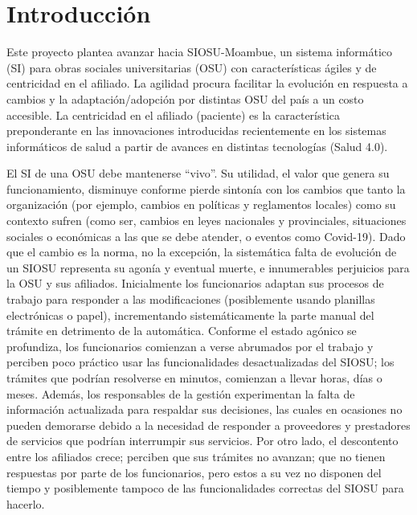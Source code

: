 \chapter{Introducción}


Este proyecto plantea avanzar hacia SIOSU-Moambue, un sistema informático (SI) para obras sociales universitarias (OSU) con características ágiles y de centricidad en el afiliado. La agilidad procura facilitar la evolución en respuesta a cambios y la adaptación/adopción por distintas OSU del país a un costo accesible.  La centricidad en el afiliado (paciente) es la característica preponderante en las innovaciones introducidas recientemente en los sistemas informáticos de salud a partir de avances en distintas tecnologías (Salud 4.0).

El SI de una OSU debe mantenerse “vivo”. Su utilidad, el valor que genera su funcionamiento, disminuye conforme pierde sintonía con los cambios que tanto la organización (por ejemplo, cambios en políticas y reglamentos locales) como su contexto sufren (como ser, cambios en leyes nacionales y provinciales, situaciones sociales o económicas a las que se debe atender, o eventos como Covid-19). Dado que el cambio es la norma, no la excepción, la sistemática falta de evolución de un SIOSU representa su agonía y eventual muerte, e innumerables perjuicios para la OSU y sus afiliados. Inicialmente los funcionarios adaptan sus procesos de trabajo para responder a las modificaciones (posiblemente usando planillas electrónicas o papel), incrementando sistemáticamente la parte manual del trámite en detrimento de la automática. Conforme el estado agónico se profundiza, los funcionarios comienzan a verse abrumados por el trabajo y perciben poco práctico usar las funcionalidades desactualizadas del SIOSU; los trámites que podrían resolverse en minutos, comienzan a llevar horas, días o meses.  Además, los responsables de la gestión experimentan la falta de información actualizada para respaldar sus decisiones, las cuales en ocasiones no pueden demorarse debido a la necesidad de responder a proveedores y prestadores de servicios que podrían interrumpir sus servicios. Por otro lado, el descontento entre los afiliados crece;  perciben que sus trámites no avanzan; que no tienen respuestas por parte de los funcionarios, pero estos a su vez no disponen del tiempo y posiblemente tampoco de las funcionalidades correctas del SIOSU para hacerlo. 

